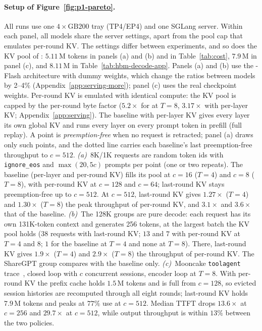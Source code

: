 \paragraph{Setup of Figure~\ref{fig:p1-pareto}.}
\label{app:serving-fig}
All runs use one $4\times\text{GB200}$ tray (TP4/EP4) and one SGLang server.
Within each panel, all models share the server settings, apart from the pool cap that emulates per-round KV. The settings differ between experiments, and so does the KV pool of \ourmethod: $5.11$\,M tokens in panels (a) and (b) and in Table~\ref{tab:cost}, $7.9$\,M in panel (c), and $8.11$\,M in Table~\ref{tab:hbm-decode-app}.
Panels (a) and (b) use the \vfour-Flash architecture with dummy weights, which change the ratios between models by 2--4\% (Appendix~\ref{app:serving-more}); panel (c) uses the real checkpoint weights.
Per-round KV is emulated with identical compute: the KV pool is capped by the per-round byte factor ($5.2\times$ for \ced at $T=8$, $3.17\times$ with per-layer KV; Appendix~\ref{app:serving}).
The baseline with per-layer KV gives every layer  its own global KV and runs every layer on every prompt token in prefill (full replay).
A point is \emph{preemption-free} when no request is retracted; panel (a) draws only such points, and the dotted line carries each baseline's last preemption-free throughput to $c=512$.
\emph{(a)}~8K/1K requests are random token ids with \texttt{ignore\_eos} and $\max(20, 5c)$ prompts per point (one or two repeats).
The baseline (per-layer and per-round KV) fills its pool at $c=16$ ($T=4$) and $c=8$ ($T=8$), \ced with per-round KV at $c=128$ and $c=64$; last-round KV stays preemption-free up to $c=512$.
At $c=512$, last-round KV gives $1.27\times$ ($T=4$) and $1.30\times$ ($T=8$) the peak throughput of per-round KV, and $3.1\times$ and $3.6\times$ that of the baseline.
\emph{(b)}~The 128K groups are pure decode: each request has its own 131K-token context and generates 256 tokens, at the largest batch the KV pool holds ($38$ requests with last-round KV; $13$ and $7$ with per-round KV at $T=4$ and $8$; $1$ for the baseline at $T=4$ and none at $T=8$).
There, last-round KV gives $1.9\times$ ($T=4$) and $2.9\times$ ($T=8$) the throughput of per-round KV.
The ShareGPT group compares \ourmethod with the baseline only.
\emph{(c)}~Mooncake \texttt{toolagent} trace~\citep{mooncake}, closed loop with $c$ concurrent sessions, encoder loop at $T=8$.
With per-round KV the prefix cache holds $1.5$\,M tokens and is full from $c=128$, so evicted session histories are recomputed through all eight rounds; last-round KV holds $7.9$\,M tokens and peaks at $77\%$ use at $c=512$.
Median TTFT drops $13.6\times$ at $c=256$ and $29.7\times$ at $c=512$, while output throughput is within $13\%$ between the two policies.

